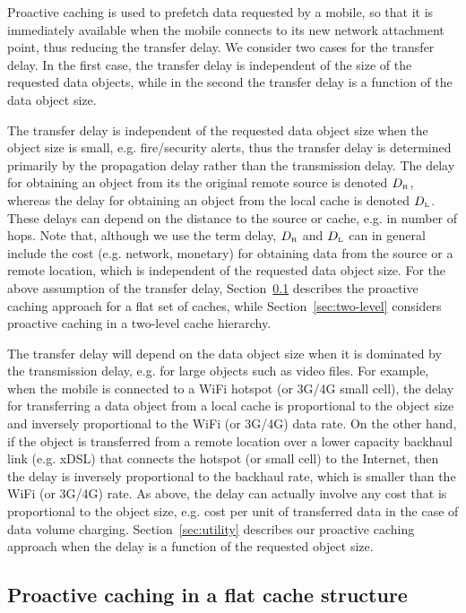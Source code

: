 \documentclass[conference]{IEEEtran}
\newcommand{\Leaf}{\mbox{\tiny L}}
\newcommand{\R}{\mbox{\tiny R}}
\begin{document}
Proactive caching is used to prefetch data requested by a mobile, so that it is immediately available when the mobile connects to its new network attachment point, thus reducing the  transfer delay.
We consider two cases for the transfer delay. In the first case, the transfer delay is independent of the size of the requested data objects, while in the second the transfer delay is a function of the data object size.


The transfer delay is independent of the requested data object size when the object size is small, e.g. fire/security alerts, thus the transfer delay is determined primarily by the propagation delay rather than the transmission delay.
The delay for obtaining an object from its the original remote source is  denoted $D_{\R}$, whereas the delay  for obtaining an object from the local cache is denoted $D_{\Leaf}$.
These delays  can depend on the distance to the source or cache, e.g. in number of hops.
Note that, although we use the term delay, $D_{\R}$ and $D_{\Leaf}$
can in general include the cost (e.g. network, monetary) for obtaining data from the source or a remote location, which is independent of the requested data object size.
For the above assumption of the transfer delay,
Section~\ref{sec:flat} describes the proactive caching approach for a flat set of caches, while Section~\ref{sec:two-level} considers proactive caching in a two-level cache hierarchy.

The transfer delay will depend on the data object size when it is dominated by the transmission delay, e.g.  for large  objects such as video files. For example, when the mobile is connected to a WiFi hotspot (or 3G/4G small cell), the delay for transferring a data object from a local cache is proportional to the object size and inversely proportional to the  WiFi (or 3G/4G) data rate.
On the other hand, if the  object is transferred from a remote location over a lower capacity  backhaul link (e.g. xDSL) that connects the hotspot (or  small cell) to the Internet, then the delay
is inversely proportional to the backhaul rate, which is smaller than the WiFi (or 3G/4G) rate. As above, the delay can actually involve any cost that is proportional to the object size, e.g. cost per unit of transferred data in the case of data volume charging.
Section~\ref{sec:utility} describes our proactive caching approach when the  delay is a function of the requested object size.


\vspace{-0.10in}
\subsection{Proactive caching in a flat cache structure}
\label{sec:flat}
\vspace{-0.03in}
\end{document}
